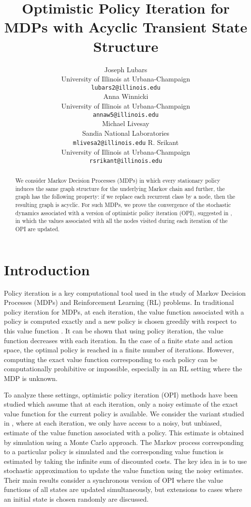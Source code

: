 \documentclass[12pt]{article}
\title{Optimistic Policy Iteration for MDPs with Acyclic Transient State Structure}
\author{%
 Joseph Lubars\\
 University of Illinois at Urbana-Champaign\\
 \texttt{lubars2@illinois.edu}\\
 \And
 Anna Winnicki\\
 University of Illinois at Urbana-Champaign\\
 \texttt{annaw5@illinois.edu}\\
 \And
 Michael Livesay\\
 Sandia National Laboratories\\
 \texttt{mlivesa2@illinois.edu}
 \And
 R. Srikant\\
 University of Illinois at Urbana-Champaign\\
 \texttt{rsrikant@illinois.edu}\\
}
\begin{document}
\maketitle
\begin{abstract}%
 We consider Markov Decision Processes (MDPs) in which every stationary policy induces the same graph structure for the underlying Markov chain and further, the graph has the following property: if we replace each recurrent class by a node, then the resulting graph is acyclic. For such MDPs, we prove the convergence of the stochastic dynamics associated with a version of optimistic policy iteration (OPI), suggested in \cite{tsitsiklis2002convergence}, in which the values associated with all the nodes visited during each iteration of the OPI are updated. %
\end{abstract}

\section{Introduction}

Policy iteration is a key computational tool used in the study of Markov Decision Processes (MDPs) and Reinforcement Learning (RL) problems. In traditional policy iteration for MDPs, at each iteration, the value function associated with a policy is computed exactly and a new policy is chosen greedily with respect to this value function \cite{bertsekasvolI, bersekasvolII, bertsekastsitsiklis, suttonbarto}. It can be shown that using policy iteration, the value function decreases with each iteration. In the case of a finite state and action space, the optimal policy is reached in a finite number of iterations. However, computing the exact value function corresponding to each policy can be computationally prohibitive or impossible, especially in an RL setting where the MDP is unknown.

To analyze these settings, optimistic policy iteration (OPI) methods have been studied which assume that at each iteration, only a noisy estimate of the exact value function for the current policy is available. We consider the variant studied in  \cite{tsitsiklis2002convergence}, where at each iteration, we only have access to a noisy, but unbiased, estimate of the value function associated with a policy. This estimate is obtained by simulation using a Monte Carlo approach. The Markov process corresponding to a particular policy is simulated and the corresponding value function is estimated by taking the infinite sum of discounted costs. The key idea in \cite{tsitsiklis2002convergence} is to use stochastic approximation to update the value function using the noisy estimates. Their main results consider a synchronous version of OPI where the value functions of all states are updated simultaneously, but extensions to cases where an initial state is chosen randomly are discussed.
\end{document}
